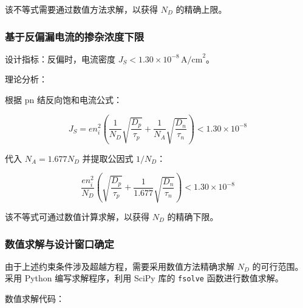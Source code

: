 \documentclass[12pt,a4paper]{article}
\begin{document}
该不等式需要通过数值方法求解，以获得 $N_D$ 的精确上限。

\subsubsection{基于反偏漏电流的掺杂浓度下限}

{\heiti 设计指标：}反偏时，电流密度 $J_S < 1.30 \times 10^{-8}\,\text{A/cm}^2$。

{\heiti 理论分析：}

根据 pn 结反向饱和电流公式：

\begin{equation}
J_S = e n_i^2 \left( \frac{1}{N_D} \sqrt{\frac{D_p}{\tau_p}} + \frac{1}{N_A} \sqrt{\frac{D_n}{\tau_n}} \right) < 1.30 \times 10^{-8}
\end{equation}

代入 $N_A = 1.677 N_D$ 并提取公因式 $1/N_D$：

\begin{equation}
\frac{e n_i^2}{N_D} \left( \sqrt{\frac{D_p}{\tau_p}} + \frac{1}{1.677} \sqrt{\frac{D_n}{\tau_n}} \right) < 1.30 \times 10^{-8}
\end{equation}

该不等式可通过数值计算求解，以获得 $N_D$ 的精确下限。

\subsubsection{数值求解与设计窗口确定}

由于上述约束条件涉及超越方程，需要采用数值方法精确求解 $N_D$ 的可行范围。采用 Python 编写求解程序，利用 SciPy 库的 \texttt{fsolve} 函数进行数值求解。

{\heiti 数值求解代码：}
\end{document}
